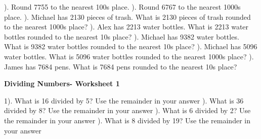 \documentclass{article}%
\begin{document}
). Round 7755 to the nearest 100s place.%
\newline%
\newline%
). Round 6767 to the nearest 1000s place.%
\newline%
\newline%
). Michael has 2130 pieces of trash. What is 2130 pieces of trash rounded to the nearest 1000s place?%
\newline%
\newline%
). Alex has 2213 water bottles. What is 2213 water bottles rounded to the nearest 10s place?%
\newline%
\newline%
). Michael has 9382 water bottles. What is 9382 water bottles rounded to the nearest 10s place?%
\newline%
\newline%
). Michael has 5096 water bottles. What is 5096 water bottles rounded to the nearest 1000s place?%
\newline%
\newline%
). James has 7684 pens. What is 7684 pens rounded to the nearest 10s place?%
\newline%
\newline%
\newline%
\pagebreak%
\large%
\begin{center}%
\textbf{Dividing Numbers- Worksheet 1}%
\newline%
\end{center} \normalsize%
1). What is 16 divided by 5? Use the remainder in your answer%
\newline%
\newline%
). What is 36 divided by 8? Use the remainder in your answer%
\newline%
\newline%
). What is 6 divided by 2? Use the remainder in your answer%
\newline%
\newline%
). What is 8 divided by 19? Use the remainder in your answer%
\end{document}
